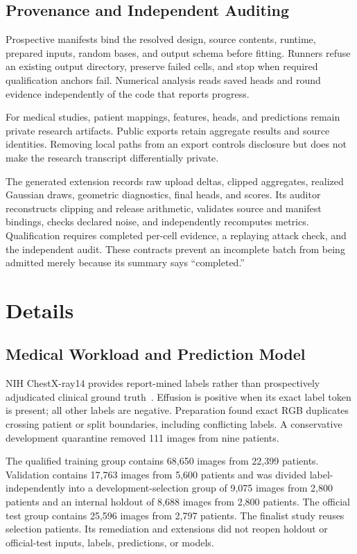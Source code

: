 \documentclass[conference,letterpaper]{IEEEtran}
\begin{document}
\subsection{Provenance and Independent Auditing}
Prospective manifests bind the resolved design, source contents, runtime, prepared inputs, random bases, and output schema before fitting. Runners refuse an existing output directory, preserve failed cells, and stop when required qualification anchors fail. Numerical analysis reads saved heads and round evidence independently of the code that reports progress.

For medical studies, patient mappings, features, heads, and predictions remain private research artifacts. Public exports retain aggregate results and source identities. Removing local paths from an export controls disclosure but does not make the research transcript differentially private.

The generated extension records raw upload deltas, clipped aggregates, realized Gaussian draws, geometric diagnostics, final heads, and scores. Its auditor reconstructs clipping and release arithmetic, validates source and manifest bindings, checks declared noise, and independently recomputes metrics. Qualification requires completed per-cell evidence, a replaying attack check, and the independent audit. These contracts prevent an incomplete batch from being admitted merely because its summary says ``completed.''

\section{Details}
\subsection{Medical Workload and Prediction Model}
NIH ChestX-ray14 provides report-mined labels rather than prospectively adjudicated clinical ground truth~\cite{chest}. Effusion is positive when its exact label token is present; all other labels are negative. Preparation found exact RGB duplicates crossing patient or split boundaries, including conflicting labels. A conservative development quarantine removed 111 images from nine patients.

The qualified training group contains 68,650 images from 22,399 patients. Validation contains 17,763 images from 5,600 patients and was divided label-independently into a development-selection group of 9,075 images from 2,800 patients and an internal holdout of 8,688 images from 2,800 patients. The official test group contains 25,596 images from 2,797 patients. The finalist study reuses selection patients. Its remediation and extensions did not reopen holdout or official-test inputs, labels, predictions, or models.
\end{document}
